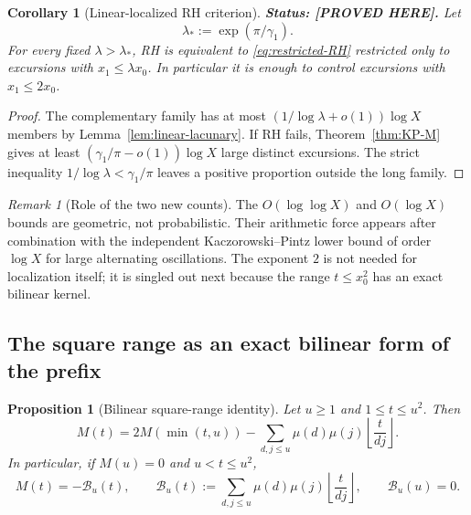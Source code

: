 \documentclass[11pt]{amsart}
\numberwithin{equation}{section}
\theoremstyle{plain}
\newtheorem{proposition}[theorem]{Proposition}
\newtheorem{corollary}[theorem]{Corollary}
\theoremstyle{definition}
\theoremstyle{remark}
\newtheorem{remark}[theorem]{Remark}
\begin{document}
\begin{corollary}[Linear-localized RH criterion]
\label{cor:linear-ordinary-RH}
\textbf{Status: [PROVED HERE].} Let
\[
\lambda_*:=\exp(\pi/\gamma_1).
\]
For every fixed $\lambda>\lambda_*$, RH is equivalent to
\eqref{eq:restricted-RH} restricted only to excursions with
$x_1\le\lambda x_0$. In particular it is enough to control excursions with
$x_1\le2x_0$.
\end{corollary}

\begin{proof}
The complementary family has at most
$(1/\log\lambda+o(1))\log X$ members by
Lemma~\ref{lem:linear-lacunary}. If RH fails, Theorem~\ref{thm:KP-M} gives
at least $(\gamma_1/\pi-o(1))\log X$ large distinct excursions. The strict
inequality $1/\log\lambda<\gamma_1/\pi$ leaves a positive proportion outside
the long family.
\end{proof}

\begin{remark}[Role of the two new counts]
\label{rem:two-counts}
The $O(\log\log X)$ and $O(\log X)$ bounds are geometric, not probabilistic.
Their arithmetic force appears after combination with the independent
Kaczorowski--Pintz lower bound of order $\log X$ for large alternating
oscillations. The exponent $2$ is not needed for localization itself; it is
singled out next because the range $t\le x_0^2$ has an exact bilinear kernel.
\end{remark}

\subsection{The square range as an exact bilinear form of the prefix}

\begin{proposition}[Bilinear square-range identity]
\label{prop:prefix-bilinear}
Let $u\ge1$ and $1\le t\le u^2$. Then
\begin{equation}
\label{eq:bilinear-general}
M(t)=2M(\min(t,u))-
\sum_{d,j\le u}\mu(d)\mu(j)\left\lfloor\frac{t}{dj}\right\rfloor.
\end{equation}
In particular, if $M(u)=0$ and $u<t\le u^2$,
\begin{equation}
\label{eq:bilinear-excursion}
M(t)=-\mathcal B_u(t),\qquad
\mathcal B_u(t):=\sum_{d,j\le u}\mu(d)\mu(j)
\left\lfloor\frac{t}{dj}\right\rfloor,
\qquad \mathcal B_u(u)=0.
\end{equation}
\end{proposition}
\end{document}
